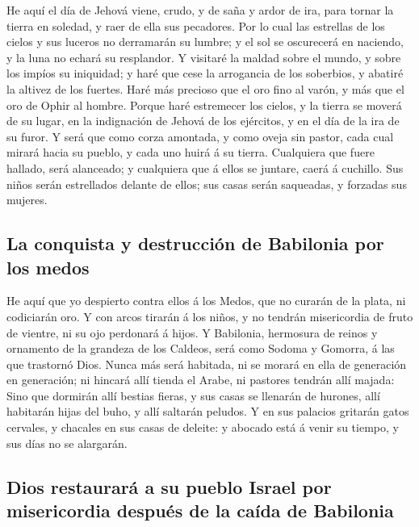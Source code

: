  He aquí el día de Jehová viene, crudo, y de saña y ardor
de ira, para tornar la tierra en soledad, y raer de ella sus pecadores.
 Por lo cual las estrellas de los cielos y sus luceros no
derramarán su lumbre; y el sol se oscurecerá en naciendo, y la luna no
echará su resplandor.  Y visitaré la maldad sobre el
mundo, y sobre los impíos su iniquidad; y haré que cese la arrogancia de
los soberbios, y abatiré la altivez de los fuertes.  Haré
más precioso que el oro fino al varón, y más que el oro de Ophir al
hombre.  Porque haré estremecer los cielos, y la tierra
se moverá de su lugar, en la indignación de Jehová de los ejércitos, y
en el día de la ira de su furor.  Y será que como corza
amontada, y como oveja sin pastor, cada cual mirará hacia su pueblo, y
cada uno huirá á su tierra.  Cualquiera que fuere
hallado, será alanceado; y cualquiera que á ellos se juntare, caerá á
cuchillo.  Sus niños serán estrellados delante de ellos;
sus casas serán saqueadas, y forzadas sus mujeres.

\hypertarget{la-conquista-y-destrucciuxf3n-de-babilonia-por-los-medos}{%
\subsection{La conquista y destrucción de Babilonia por los
medos}\label{la-conquista-y-destrucciuxf3n-de-babilonia-por-los-medos}}

 He aquí que yo despierto contra ellos á los Medos, que
no curarán de la plata, ni codiciarán oro.  Y con arcos
tirarán á los niños, y no tendrán misericordia de fruto de vientre, ni
su ojo perdonará á hijos.  Y Babilonia, hermosura de
reinos y ornamento de la grandeza de los Caldeos, será como Sodoma y
Gomorra, á las que trastornó Dios.  Nunca más será
habitada, ni se morará en ella de generación en generación; ni hincará
allí tienda el Arabe, ni pastores tendrán allí majada: 
Sino que dormirán allí bestias fieras, y sus casas se llenarán de
hurones, allí habitarán hijas del buho, y allí saltarán peludos.
 Y en sus palacios gritarán gatos cervales, y chacales en
sus casas de deleite: y abocado está á venir su tiempo, y sus días no se
alargarán.

\hypertarget{dios-restauraruxe1-a-su-pueblo-israel-por-misericordia-despuuxe9s-de-la-cauxedda-de-babilonia}{%
\subsection{Dios restaurará a su pueblo Israel por misericordia después
de la caída de
Babilonia}\label{dios-restauraruxe1-a-su-pueblo-israel-por-misericordia-despuuxe9s-de-la-cauxedda-de-babilonia}}

